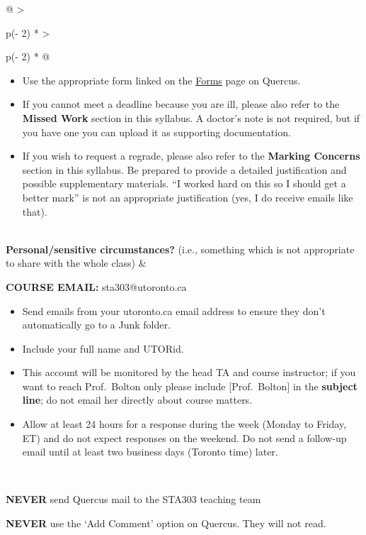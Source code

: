 \documentclass[
  openany]{book}
\begin{document}
\begin{longtable}[]{@{}
  >{\raggedright\arraybackslash}p{(\columnwidth - 2\tabcolsep) * }
  >{\raggedright\arraybackslash}p{(\columnwidth - 2\tabcolsep) * }@{}}
\begin{minipage}[t]{\linewidth}
\begin{itemize}
\item
  Use the appropriate form linked on the \href{https://q.utoronto.ca/courses/253305/pages/forms}{Forms} page on Quercus.
\item
  If you cannot meet a deadline because you are ill, please also refer to the \textbf{Missed Work} section in this syllabus. A doctor's note is not required, but if you have one you can upload it as supporting documentation.
\item
  If you wish to request a regrade, please also refer to the \textbf{Marking Concerns} section in this syllabus. Be prepared to provide a detailed justification and possible supplementary materials. ``I worked hard on this so I should get a better mark'' is not an appropriate justification (yes, I do receive emails like that).
\end{itemize}
\end{minipage} \\
\textbf{Personal/sensitive circumstances?} (i.e., something which is not appropriate to share with the whole class) & \begin{minipage}[t]{\linewidth}\raggedright
\textbf{COURSE EMAIL:} sta303@utoronto.ca

\begin{itemize}
\item
  Send emails from your utoronto.ca email address to ensure they don't automatically go to a Junk folder.
\item
  Include your full name and UTORid.
\item
  This account will be monitored by the head TA and course instructor; if you want to reach Prof.~Bolton only please include {[}Prof.~Bolton{]} in the \textbf{subject line}; do not email her directly about course matters.
\item
  Allow at least 24 hours for a response during the week (Monday to Friday, ET) and do not expect responses on the weekend. Do not send a follow-up email until at least two business days (Toronto time) later.
\end{itemize}
\end{minipage} \\
\bottomrule
\end{longtable}

\textbf{NEVER} send Quercus mail to the STA303 teaching team

\textbf{NEVER} use the `Add Comment' option on Quercus. They will not read.
\end{document}
